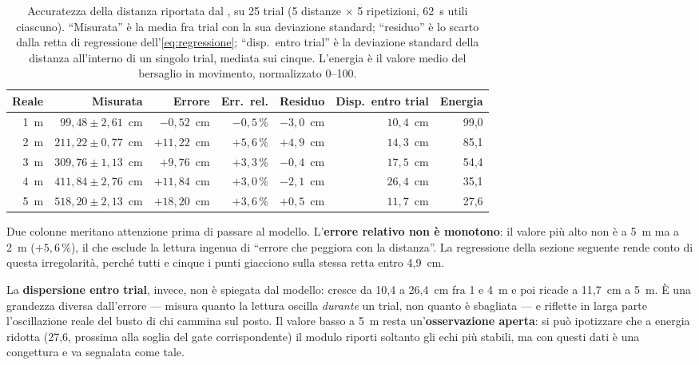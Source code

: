 \begin{table}[htbp]
\centering
\caption{Accuratezza della distanza riportata dal \ldb, su 25 trial (5 distanze
$\times$ 5 ripetizioni, 62~s utili ciascuno). ``Misurata'' è la media fra trial con la
sua deviazione standard; ``residuo'' è lo scarto dalla retta di regressione
dell'\cref{eq:regressione}; ``disp.\ entro trial'' è la deviazione standard della
distanza all'interno di un singolo trial, mediata sui cinque. L'energia è il valore
medio del bersaglio in movimento, normalizzato 0--100.}
\label{tab:distanza}
\small
\begin{tabular}{@{}rrrrrrr@{}}
\toprule
\textbf{Reale} & \textbf{Misurata} & \textbf{Errore} & \textbf{Err.\ rel.} &
\textbf{Residuo} & \textbf{Disp.\ entro trial} & \textbf{Energia} \\
\midrule
1~m & $99{,}48 \pm 2{,}61$~cm  & $-0{,}52$~cm & $-0{,}5\,\%$ & $-3{,}0$~cm & $10{,}4$~cm & 99,0 \\
2~m & $211{,}22 \pm 0{,}77$~cm & $+11{,}22$~cm & $+5{,}6\,\%$ & $+4{,}9$~cm & $14{,}3$~cm & 85,1 \\
3~m & $309{,}76 \pm 1{,}13$~cm & $+9{,}76$~cm & $+3{,}3\,\%$ & $-0{,}4$~cm & $17{,}5$~cm & 54,4 \\
4~m & $411{,}84 \pm 2{,}76$~cm & $+11{,}84$~cm & $+3{,}0\,\%$ & $-2{,}1$~cm & $26{,}4$~cm & 35,1 \\
5~m & $518{,}20 \pm 2{,}13$~cm & $+18{,}20$~cm & $+3{,}6\,\%$ & $+0{,}5$~cm & $11{,}7$~cm & 27,6 \\
\bottomrule
\end{tabular}
\end{table}

Due colonne meritano attenzione prima di passare al modello. L'\textbf{errore
relativo non è monotono}: il valore più alto non è a 5~m ma a 2~m ($+5{,}6\,\%$), il
che esclude la lettura ingenua di ``errore che peggiora con la distanza''. La
regressione della sezione seguente rende conto di questa irregolarità, perché tutti e
cinque i punti giacciono sulla stessa retta entro 4,9~cm.

La \textbf{dispersione entro trial}, invece, non è spiegata dal modello: cresce da
10,4 a 26,4~cm fra 1 e 4~m e poi ricade a 11,7~cm a 5~m. È una grandezza diversa
dall'errore --- misura quanto la lettura oscilla \emph{durante} un trial, non quanto è
sbagliata --- e riflette in larga parte l'oscillazione reale del busto di chi cammina
sul posto. Il valore basso a 5~m resta un'\textbf{osservazione aperta}: si può
ipotizzare che a energia ridotta (27,6, prossima alla soglia del gate corrispondente)
il modulo riporti soltanto gli echi più stabili, ma con questi dati è una congettura e
va segnalata come tale.

